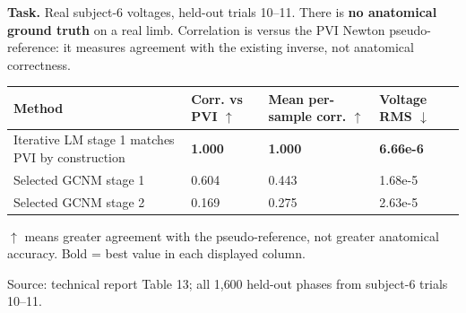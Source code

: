 \documentclass[border=6pt]{standalone}
\begin{document}
\begin{minipage}{18.2cm}

  \vspace{0.3em}
  {\small\color{realCoral}\textbf{Task.} Real subject-6 voltages, held-out
  trials 10--11. There is \textbf{no anatomical ground truth} on a real
  limb. \mbox{Correlation} is versus the PVI Newton pseudo-reference: it measures
  agreement with the existing inverse, not anatomical correctness.}

  \vspace{0.55em}
  \renewcommand{\arraystretch}{1.52}
  \setlength{\tabcolsep}{7pt}
  \begin{tabular}{@{}L{6.4cm}C{2.9cm}C{4.0cm}C{2.8cm}@{}}
    \toprule
    \textbf{Method} &
    \textbf{Corr. vs PVI $\uparrow$} &
    \textbf{Mean per-sample corr. $\uparrow$} &
    \textbf{Voltage RMS $\downarrow$} \\
    \midrule
    Iterative LM stage 1\newline
      {\footnotesize\color{baselineGray}matches PVI by construction} &
      \textbf{1.000} & \textbf{1.000} & \textbf{6.66e-6} \\
    Selected GCNM stage 1 & 0.604 & 0.443 & 1.68e-5 \\
    Selected GCNM stage 2 & 0.169 & 0.275 & 2.63e-5 \\
    \bottomrule
  \end{tabular}


  \vspace{0.1em}
  {\footnotesize\color{realCoral}
  $\uparrow$ means greater agreement with the pseudo-reference, not greater
  anatomical accuracy. Bold = best value in each displayed column.}

  \vspace{0.25em}
  {\scriptsize\color{baselineGray}Source: technical report Table 13; all
  1,600 held-out phases from subject-6 trials 10--11.}
\end{minipage}
\end{document}
